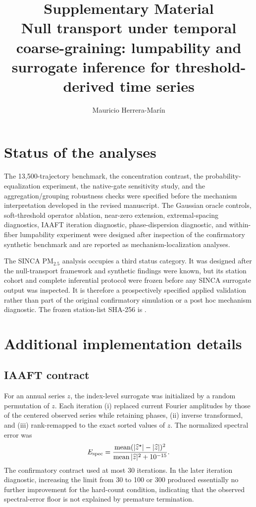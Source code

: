 \documentclass[11pt]{article}
\title{Supplementary Material\\\large Null transport under temporal coarse-graining: lumpability and surrogate inference for threshold-derived time series}
\author{Mauricio Herrera-Mar\'in}
\date{}
\begin{document}
\maketitle

\section{Status of the analyses}
The 13,500-trajectory benchmark, the concentration contrast, the probability-equalization experiment, the native-gate sensitivity study, and the aggregation/grouping robustness checks were specified before the mechanism interpretation developed in the revised manuscript. The Gaussian oracle controls, soft-threshold operator ablation, near-zero extension, extremal-spacing diagnostics, IAAFT iteration diagnostic, phase-dispersion diagnostic, and within-fiber lumpability experiment were designed after inspection of the confirmatory synthetic benchmark and are reported as mechanism-localization analyses.

The SINCA PM$_{2.5}$ analysis occupies a third status category. It was designed after the null-transport framework and synthetic findings were known, but its station cohort and complete inferential protocol were frozen before any SINCA surrogate output was inspected. It is therefore a prospectively specified applied validation rather than part of the original confirmatory simulation or a post hoc mechanism diagnostic. The frozen station-list SHA-256 is .

\section{Additional implementation details}

\subsection{IAAFT contract}
For an annual series $z$, the index-level surrogate was initialized by a random permutation of $z$. Each iteration (i) replaced current Fourier amplitudes by those of the centered observed series while retaining phases, (ii) inverse transformed, and (iii) rank-remapped to the exact sorted values of $z$. The normalized spectral error was
\[
E_{\rm spec}=\frac{\operatorname{mean}(|\widehat z^\star|-|\widehat z|)^2}{\operatorname{mean}|\widehat z|^2+10^{-15}}.
\]
The confirmatory contract used at most 30 iterations. In the later iteration diagnostic, increasing the limit from 30 to 100 or 300 produced essentially no further improvement for the hard-count condition, indicating that the observed spectral-error floor is not explained by premature termination.
\end{document}
